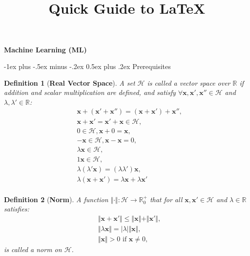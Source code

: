 \documentclass[10pt,landscape]{article}
\title{Quick Guide to LaTeX}
\makeatletter
\newtheorem*{definition*}{Definition}
\renewcommand{\section}{\@startsection{section}{1}{0mm}%
                                {-1ex plus -.5ex minus -.2ex}%
                                {0.5ex plus .2ex}%
                                {\normalfont\large\bfseries}}
\makeatother
\begin{document}
\raggedright
\footnotesize

\begin{center}
     \Large{\textbf{Machine Learning (ML)}} \\
\end{center}
\begin{multicols}{3}
\setlength{\premulticols}{1pt}
\setlength{\postmulticols}{1pt}
\setlength{\multicolsep}{1pt}
\setlength{\columnsep}{2pt}

\section{Prerequisites}

\begin{definition*}[\textbf{Real Vector Space}]
A set $\mathcal{H}$ is called a vector space over $\mathbb{R}$ if addition and scalar multiplication are defined, and satisfy $\forall \mathbf{x}, \mathbf{x'}, \mathbf{x''} \in \mathcal{H}$ and $\lambda, \lambda' \in \mathbb{R}$:
\begin{align*}
& \mathbf{x} + \left( \mathbf{x'} + \mathbf{x''} \right) = \left( \mathbf{x} + \mathbf{x'} \right) + \mathbf{x''}, \\
& \mathbf{x} + \mathbf{x'} = \mathbf{x'} + \mathbf{x} \in \mathcal{H}, \\ 
& 0 \in \mathcal{H}, \mathbf{x} + 0 = \mathbf{x}, \\ 
& -\mathbf{x} \in \mathcal{H}, \mathbf{x} - \mathbf{x} = 0, \\ 
& \lambda \mathbf{x} \in \mathcal{H}, \\
& 1 \mathbf{x} \in \mathcal{H}, \\
& \lambda \left( \lambda' \mathbf{x} \right) = \left( \lambda \lambda' \right) \mathbf{x}, \\
& \lambda \left( \mathbf{x} + \mathbf{x'} \right) = \lambda \mathbf{x} + \lambda \mathbf{x'} \\
\end{align*}
\end{definition*}

\begin{definition*}[\textbf{Norm}]
A function $\Vert \cdot \Vert : \mathcal{H} \rightarrow \mathbb{R}_0^{+}$ that for all $\mathbf{x}, \mathbf{x'} \in \mathcal{H}$ and $\lambda \in \mathbb{R}$ satisfies:
\begin{align*}
& \Vert \mathbf{x} + \mathbf{x'} \Vert \leq \Vert \mathbf{x} \Vert + \Vert \mathbf{x'} \Vert, \\
& \Vert \lambda \mathbf{x} \Vert = \vert \lambda \vert \Vert \mathbf{x} \Vert, \\
& \Vert \mathbf{x} \Vert > 0 \textrm{ if } \mathbf{x} \neq 0,
\end{align*}
is called a norm on $\mathcal{H}$.
\end{definition*}


\end{multicols}
\end{document}
